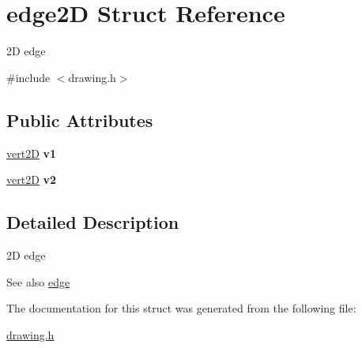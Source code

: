 \hypertarget{structedge2_d}{}\section{edge2D Struct Reference}
\label{structedge2_d}


2D edge  




{\ttfamily \#include $<$drawing.\+h$>$}

\subsection*{Public Attributes}
\begin{DoxyCompactItemize}
\item 
\mbox{\label{structedge2_d_a9fa8c5d5fefa56cd6e0e2a31d301f507}} 
\mbox{\hyperlink{structvert2_d}{vert2D}} {\bfseries v1}
\item 
\mbox{\label{structedge2_d_a1f21e0ab04e114edb954e03fe2c3a60a}} 
\mbox{\hyperlink{structvert2_d}{vert2D}} {\bfseries v2}
\end{DoxyCompactItemize}


\subsection{Detailed Description}
2D edge 

\begin{DoxySeeAlso}{See also}
\mbox{\hyperlink{structedge}{edge}} 
\end{DoxySeeAlso}


The documentation for this struct was generated from the following file\+:\begin{DoxyCompactItemize}
\item 
\mbox{\hyperlink{drawing_8h}{drawing.\+h}}\end{DoxyCompactItemize}

